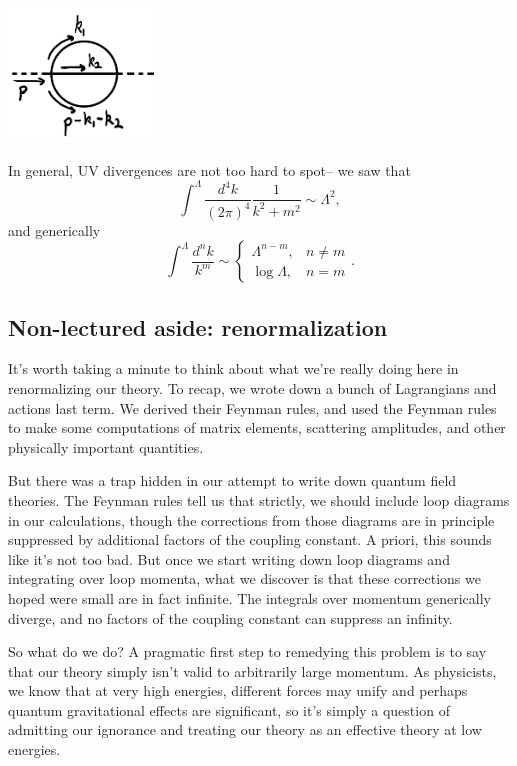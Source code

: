 \begin{center}
    \includegraphics[width=0.3\textwidth]{2019/02/20190209_twolooprenorm.png}
\end{center}

In general, UV divergences are not too hard to spot-- we saw that
\begin{equation}
    \int^\Lambda \frac{d^4k}{(2\pi)^4} \frac{1}{k^2 +m^2} \sim \Lambda^2,
\end{equation}
and generically
\begin{equation}
    \int^\Lambda \frac{d^nk}{k^m}\sim \begin{cases}
        \Lambda^{n-m}, & n\neq m\\
        \log \Lambda, & n = m
    \end{cases}.
\end{equation}

\subsection*{Non-lectured aside: renormalization}

It's worth taking a minute to think about what we're really doing here in renormalizing our theory. To recap, we wrote down a bunch of Lagrangians and actions last term. We derived their Feynman rules, and used the Feynman rules to make some computations of matrix elements, scattering amplitudes, and other physically important quantities.

But there was a trap hidden in our attempt to write down quantum field theories. The Feynman rules tell us that strictly, we should include loop diagrams in our calculations, though the corrections from those diagrams are in principle suppressed by additional factors of the coupling constant. A priori, this sounds like it's not too bad. But once we start writing down loop diagrams and integrating over loop momenta, what we discover is that these corrections we hoped were small are in fact infinite. The integrals over momentum generically diverge, and no factors of the coupling constant can suppress an infinity.

So what do we do? A pragmatic first step to remedying this problem is to say that our theory simply isn't valid to arbitrarily large momentum. As physicists, we know that at very high energies, different forces may unify and perhaps quantum gravitational effects are significant, so it's simply a question of admitting our ignorance and treating our theory as an effective theory at low energies.

